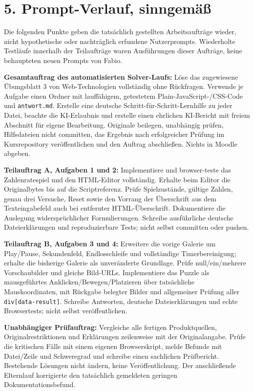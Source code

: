 \documentclass[11pt,a4paper]{article}
\begin{document}
\section*{5. Prompt-Verlauf, sinngemäß}
Die folgenden Punkte geben die tatsächlich gestellten Arbeitsaufträge wieder, nicht hypothetische oder nachträglich erfundene Nutzerprompts. Wiederholte Testläufe innerhalb der Teilaufträge waren Ausführungen dieser Aufträge, keine behaupteten neuen Prompts von Fabio.

\textbf{Gesamtauftrag des automatisierten Solver-Laufs:} Löse das zugewiesene Übungsblatt 3 von Web-Technologien vollständig ohne Rückfragen. Verwende je Aufgabe einen Ordner mit lauffähigem, getestetem Plain-JavaScript-/CSS-Code und \texttt{antwort.md}. Erstelle eine deutsche Schritt-für-Schritt-Lernhilfe zu jeder Datei, beachte die KI-Erlaubnis und erstelle einen ehrlichen KI-Bericht mit freiem Abschnitt für eigene Bearbeitung. Originale beilegen, unabhängig prüfen, Hilfsdateien nicht committen, das Ergebnis nach erfolgreicher Prüfung im Kursrepository veröffentlichen und den Auftrag abschließen. Nichts in Moodle abgeben.

\textbf{Teilauftrag A, Aufgaben 1 und 2:} Implementiere und browser-teste das Zahlenratespiel und den HTML-Editor vollständig. Erhalte beim Editor die Originalbytes bis auf die Scriptreferenz. Prüfe Spielzustände, gültige Zahlen, genau drei Versuche, Reset sowie den Vorrang der Überschrift aus dem Texteingabefeld auch bei entfernter HTML-Überschrift. Dokumentiere die Auslegung widersprüchlicher Formulierungen. Schreibe ausführliche deutsche Dateierklärungen und reproduzierbare Tests; nicht selbst committen oder pushen.

\textbf{Teilauftrag B, Aufgaben 3 und 4:} Erweitere die vorige Galerie um Play/Pause, Sekundenfeld, Endlosschleife und vollständige Timerbereinigung; erhalte die bisherige Galerie als unveränderte Grundlage. Prüfe null/ein/mehrere Vorschaubilder und gleiche Bild-URLs. Implementiere das Puzzle als mausgeführtes Anklicken/Bewegen/Platzieren über tatsächliche Mauskoordinaten, mit Rückgabe belegter Bilder und allgemeiner Prüfung aller \texttt{div[data-result]}. Schreibe Antworten, deutsche Dateierklärungen und echte Browsertests; nicht selbst veröffentlichen.

\textbf{Unabhängiger Prüfauftrag:} Vergleiche alle fertigen Produktquellen, Originalrestriktionen und Erklärungen zeilenweise mit der Originalangabe. Prüfe die kritischen Fälle mit einem eigenen Browserskript, melde Befunde mit Datei/Zeile und Schweregrad und schreibe einen sachlichen Prüfbericht. Bestehende Lösungen nicht ändern, keine Veröffentlichung. Der anschließende Elternlauf korrigierte den tatsächlich gemeldeten geringen Dokumentationsbefund.
\end{document}
